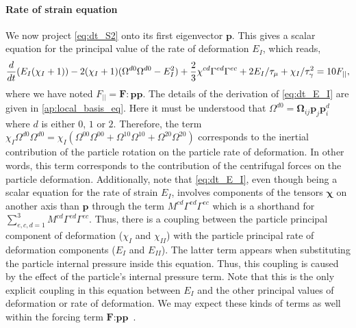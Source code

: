 \paragraph*{Rate of strain equation}
We now project \ref{eq:dt_S2} onto its first eigenvector $\textbf{p}$.
This gives a scalar equation for the principal value of the rate of deformation $E_I$, which reads, 
\begin{equation}
        \ddt (E_I (\chi_I+1))
        - 2(\chi_I+1)( \Omega^{d0} \Omega^{d0}  - E_I^2) 
        + \frac{2}{3} \chi^{cd}
        \Gamma^{ed}\Gamma^{ec}
    + 2 E_I / \tau_\mu
    +  \chi_I /\tau_\gamma^2
    = 10 F_{||},
    \label{eq:dt_E_I}
\end{equation} 
where we have noted $F_{||} = \textbf{F}: \textbf{pp}$.
The details of the derivation of \ref{eq:dt_E_I} are given in \ref{ap:local_basis_eq}. 
Here it must be understood that $\Omega^{d0}  = \bm\Omega_{ij} \textbf{p}_j \textbf{p}^{d}_i $ where $d$ is either $0$, $1$ or $2$. 
Therefore, the term $\chi_I \Omega^{d0} \Omega^{d0} =\chi_I (\Omega^{00} \Omega^{00} + \Omega^{10} \Omega^{10} +\Omega^{20} \Omega^{20} ) $ corresponds to the inertial contribution of the particle rotation on the particle rate of deformation. 
In other words, this term corresponds to the contribution of the centrifugal forces on the particle deformation. 
Additionally, note that \ref{eq:dt_E_I}, even though being a scalar equation for the rate of strain $E_I$, involves components of the tensors $\bm\chi$ on another axis than $\textbf{p}$ through the term $M^{cd}\Gamma^{ed}\Gamma^{ec}$ which is a shorthand for $\sum_{e,c,d=1}^3 M^{cd}\Gamma^{ed}\Gamma^{ec}$. 
Thus, there is a coupling between the particle principal component of deformation ($\chi_I$ and $\chi_{II}$) with the particle principal rate of deformation components ($E_I$ and $E_{II}$).
The latter term appears when substituting the particle internal pressure inside this equation. 
Thus, this coupling is caused by the effect of the particle's internal pressure term. 
Note that this is the only explicit coupling in this equation between $E_I$ and the other principal values of deformation or rate of deformation. 
We may expect these kinds of terms as well within the forcing term $\textbf{F}:\textbf{pp}$ . 


